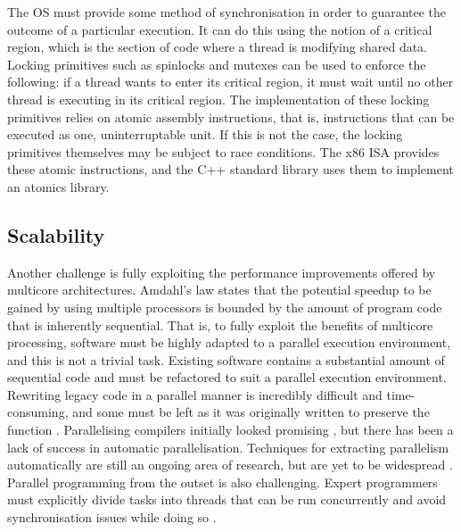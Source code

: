 \documentclass[bsc,frontabs,singlespacing,parskip,deptreport]{infthesis}     %
\begin{document}
The OS must provide some method of synchronisation in order to guarantee the outcome of a particular execution. It can do this using the notion of a critical region, which is the section of code where a thread is modifying shared data. Locking primitives such as spinlocks and mutexes can be used to enforce the following: if a thread wants to enter its critical region, it must wait until no other thread is executing in its critical region. The implementation of these locking primitives relies on atomic assembly instructions, that is, instructions that can be executed as one, uninterruptable unit. If this is not the case, the locking primitives themselves may be subject to race conditions. The x86 ISA provides these atomic instructions, and the C++ standard library uses them to implement an atomics library.

\subsection{Scalability} \label{scalability-challenges}
Another challenge is fully exploiting the performance improvements offered by multicore architectures. Amdahl’s law \cite{DBLP:conf/afips/Amdahl67} \cite{DBLP:journals/computer/Amdahl13} states that the potential speedup to be gained by using multiple processors is bounded by the amount of program code that is inherently sequential. That is, to fully exploit the benefits of multicore processing, software must be highly adapted to a parallel execution environment, and this is not a trivial task. Existing software contains a substantial amount of sequential code and must be refactored to suit a parallel execution environment. Rewriting legacy code in a parallel manner is incredibly difficult and time-consuming, and some must be left as it was originally written to preserve the function \cite{geer}. Parallelising compilers initially looked promising \cite{lamport}, but there has been a lack of success in automatic parallelisation. Techniques for extracting parallelism automatically are still an ongoing area of research, but are yet to be widespread \cite{franke}. Parallel programming from the outset is also challenging. Expert programmers must explicitly divide tasks into threads that can be run concurrently and avoid synchronisation issues while doing so \cite{geer}. 
\end{document}
